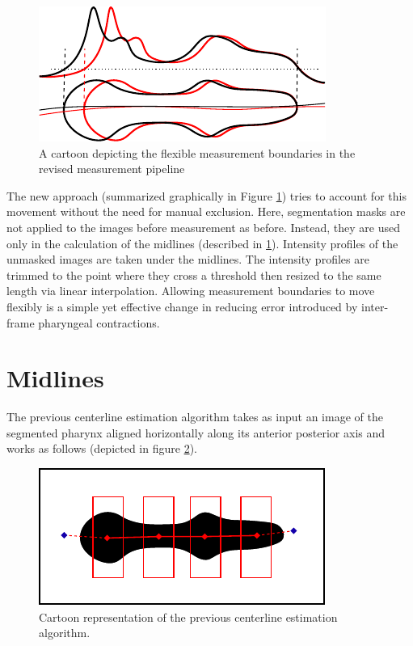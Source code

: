 \begin{figure}[ht]
    \centering
    \includegraphics[scale=1.20]{Figures/rendered_files/new_boundaries_cartoon}
    \decoRule
    \caption[Flexible measurement boundaries]{A cartoon depicting the flexible measurement boundaries in the revised measurement pipeline}
    \label{fig:NewBoundariesCartoon}
\end{figure}

The new approach (summarized graphically in Figure \ref{fig:NewBoundariesCartoon}) tries to account for this movement without the need for manual exclusion. Here, segmentation masks are not applied to the images before measurement as before. Instead, they are used only in the calculation of the midlines (described in \ref{Midlines}). Intensity profiles of the unmasked images are taken under the midlines. The intensity profiles are trimmed to the point where they cross a threshold then resized to the same length via linear interpolation. Allowing measurement boundaries to move flexibly is a simple yet effective change in reducing error introduced by inter-frame pharyngeal contractions.

\section{Midlines} \label{Midlines}

The previous centerline estimation algorithm takes as input an image of the segmented pharynx aligned horizontally along its anterior posterior axis and works as follows (depicted in figure \ref{fig:oldMidline}).

\begin{figure}[ht]
    \centering
    \includegraphics[scale=1.5]{Figures/rendered_files/old_midline_algorithm}
    \decoRule
    \caption[Previous centerline estimation algorithm]{Cartoon representation of the previous centerline estimation algorithm.}
    \label{fig:oldMidline}
\end{figure}

